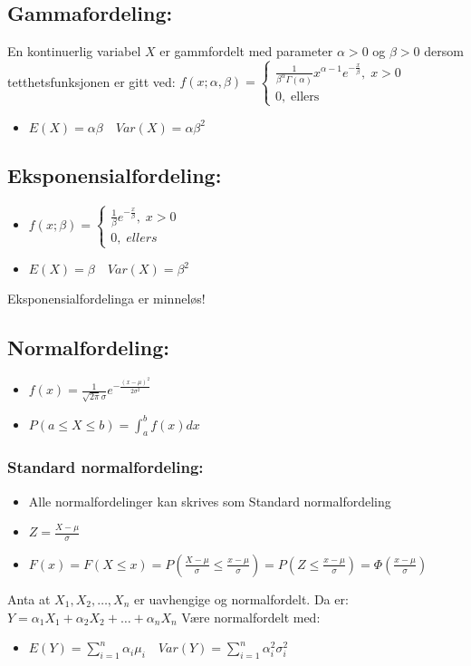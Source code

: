 \documentclass[8pt,a4paper,twocolumn,twoside]{article}
\def\forvar#1#2#3{E(#1)=#2 \quad Var(#1)=#3}
\begin{document}
\subsection*{Gammafordeling:}
En kontinuerlig variabel $X$ er gammfordelt med parameter $\alpha>0$ og $\beta>0$
dersom tetthetsfunksjonen er gitt ved:
$f(x;\alpha,\beta) = \begin{cases}
    \frac{1}{\beta^\alpha \Gamma(\alpha)} x^{\alpha-1} e^{-\frac{x}{\beta}},\; x>0\\
    0,\;\text{ellers}
\end{cases}$
\begin{itemize}[topsep=0pt,itemsep=0pt, partopsep=0pt]
    \item $E(X)=\alpha\beta \quad Var(X)=\alpha\beta^2$
\end{itemize}
%
%
\subsection*{Eksponensialfordeling:}
\begin{itemize}[topsep=0pt,itemsep=0pt, partopsep=0pt]
    \item $f(x;\beta)=\begin{cases}
        \frac{1}{\beta}e^{-\frac{x}{\beta}},\;x>0\\
        0,\;ellers
    \end{cases}$
    \item $\forvar{X}{\beta}{\beta^2}$
\end{itemize}
Eksponensialfordelinga er minneløs!
%
%
\subsection*{Normalfordeling:}
\begin{itemize}[topsep=0pt,itemsep=0pt, partopsep=0pt]
    \item $f(x)=\frac{1}{\sqrt{2\pi}\sigma}e^{-\frac{(x-\mu)^2}{2\sigma^2}}$
    \item $P(a\leq X \leq b) = \int_a^b f(x)dx$
\end{itemize}
\subsubsection*{Standard normalfordeling:}
\begin{itemize}[topsep=0pt,itemsep=0pt, partopsep=0pt]
    \item Alle normalfordelinger kan skrives som Standard normalfordeling
    \item $Z=\frac{X-\mu}{\sigma}$
    \item $F(x)=F(X\leq x) = P\left(\frac{X-\mu}{\sigma}\leq\frac{x-\mu}{\sigma}\right)=P\left( Z\leq \frac{x-\mu}{\sigma} \right)=\Phi\left(\frac{x-\mu}{\sigma}\right)$ 
\end{itemize}
Anta at $X_1,X_2,\dots,X_n$ er uavhengige og normalfordelt. Da er:
$Y=\alpha_1 X_1+\alpha_2 X_2+\dots+\alpha_n X_n$
Være normalfordelt med:
\begin{itemize}[topsep=0pt,itemsep=0pt, partopsep=0pt]
    \item $E(Y)=\sum_{i=1}^n \alpha_i \mu_i\quad Var(Y)=\sum_{i=1}^n \alpha^2_i\sigma^2_i$
\end{itemize}
\end{document}
